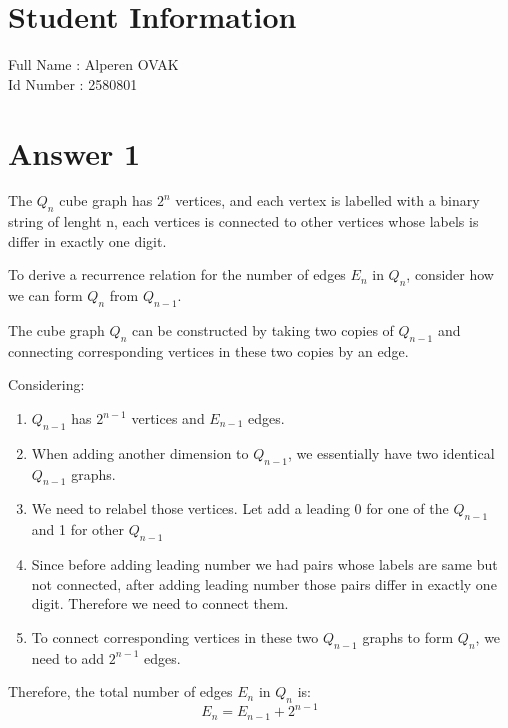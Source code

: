 \documentclass[12pt]{article}
\begin{document}
\section*{Student Information } 
Full Name :  Alperen OVAK\\
Id Number :  2580801\\

\section*{Answer 1}

The \( Q_n \) cube graph has \( 2^n \) vertices, and each vertex is labelled with a binary string of lenght n, each vertices is connected to other vertices whose labels is differ in exactly one digit.

To derive a recurrence relation for the number of edges \( E_n \) in \( Q_n \), consider how we can form \( Q_n \) from \( Q_{n-1} \).

The cube graph \( Q_n \) can be constructed by taking two copies of \( Q_{n-1} \) and connecting corresponding vertices in these two copies by an edge.

Considering:

\begin{enumerate}
    \item \( Q_{n-1} \) has \( 2^{n-1} \) vertices and \( E_{n-1} \) edges.
    \item When adding another dimension to \( Q_{n-1} \), we essentially have two identical \( Q_{n-1} \) graphs.
    \item We need to relabel those vertices. Let add a leading 0 for one of the \( Q_{n-1} \) and 1 for other \( Q_{n-1} \)
    \item Since before adding leading number we had pairs whose labels are same but not connected, after adding leading number those pairs differ in exactly one digit. Therefore we need to connect them.
    \item To connect corresponding vertices in these two \( Q_{n-1} \) graphs to form \( Q_n \), we need to add \( 2^{n-1} \) edges.
\end{enumerate}

Therefore, the total number of edges \( E_n \) in \( Q_n \) is:
\[ E_n = E_{n-1} + 2^{n-1} \]
\end{document}
